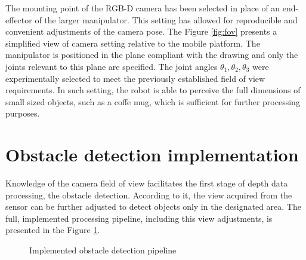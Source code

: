 The mounting point of the RGB-D camera has been selected in place of an end-effector of the larger manipulator. This setting has allowed for reproducible and convenient adjustments of the camera pose. The Figure \ref{fig:fov} presents a simplified view of camera setting relative to the mobile platform. The manipulator is positioned in the plane compliant with the drawing and only the joints relevant to this plane are specified. The joint angles $\theta_1, \theta_2, \theta_3$ were experimentally selected to meet the previously established field of view requirements. In such setting, the robot is able to perceive the full dimensions of small sized objects, such as a coffe mug, which is sufficient for further processing purposes.




\section{Obstacle detection implementation}
\label{sec:objavoid}

Knowledge of the camera field of view facilitates the first stage of depth data processing, the obstacle detection. According to it, the view acquired from the sensor can be further adjusted to detect objects only in the designated area. The full, implemented processing pipeline, including this view adjustments, is presented in the Figure \ref{fig:detectpipe}.

\begin{figure}[H]
\begin{center}

\caption{Implemented obstacle detection pipeline}

\label{fig:detectpipe}

\end{center}
\end{figure}

